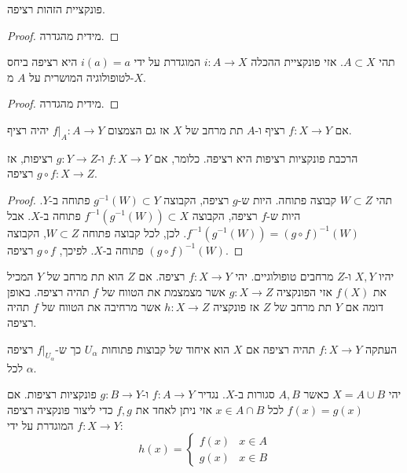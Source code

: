 \documentclass{tstextbook}
\begin{document}
\begin{proposition}
פונקציית הזהות רציפה.

\end{proposition}
\begin{proof}
מידית מהגדרה.

\end{proof}
\begin{proposition}
תהי \(A \subset X\). אזי פונקציית ההכלה \(i: A \to X\) המוגדרת על ידי \(i(a) = a\) היא רציפה ביחס לטופולוגיה המושרית על \(A\) מ-\(X\).

\end{proposition}
\begin{proof}
מידית מהגדרה.

\end{proof}
\begin{proposition}
אם \(f:X\to Y\) רציף ו-\(A\) תת מרחב של \(X\) אז גם הצמצום \(f|_{A}:A\to Y\) יהיה רציף.

\end{proposition}
\begin{proposition}
הרכבת פונקציות רציפות היא רציפה. כלומר, אם \(f: X \to Y\) ו-\(g: Y \to Z\) רציפות, אז \(g \circ f: X \to Z\) רציפה.

\end{proposition}
\begin{proof}
תהי \(W \subset Z\) קבוצה פתוחה. היות ש-\(g\) רציפה, הקבוצה \(g^{-1}(W) \subset Y\) פתוחה ב-\(Y\). היות ש-\(f\) רציפה, הקבוצה \(f^{-1}(g^{-1}(W)) \subset X\) פתוחה ב-\(X\). אבל \(f^{-1}(g^{-1}(W)) = (g \circ f)^{-1}(W)\). לכן, לכל קבוצה פתוחה \(W \subset Z\), הקבוצה \((g \circ f)^{-1}(W)\) פתוחה ב-\(X\). לפיכך, \(g \circ f\) רציפה.

\end{proof}
\begin{proposition}
יהיו \(X,Y\) ו-\(Z\) מרחבים טופולוגיים. יהי \(f:X\to Y\) רציפה. אם \(Z\) הוא תת מרחב של \(Y\) המכיל את \(f(X)\) אזי הפונקציה \(g:X\to Z\) אשר מצמצמת את הטווח של \(f\) תהיה רציפה. באופן דומה אם \(Y\) תת מרחב של \(Z\) אז פונקציה \(h:X\to Z\) אשר מרחיבה את הטווח של \(f\) תהיה רציפה.

\end{proposition}
\begin{proposition}
העתקה \(f:X\to Y\) תהיה רציפה אם \(X\) הוא איחוד של קבוצות פתוחות \(U_{\alpha}\) כך ש-\(f|_{U_{\alpha}}\) רציפה לכל \(\alpha\).

\end{proposition}
\begin{proposition}
יהי \(X=A\cup B\) כאשר \(A,B\) סגורות ב-\(X\). נגדיר \(f:A\to Y\) ו-\(g:B\to Y\) פונקציות רציפות. אם \(f(x)=g(x)\) לכל \(x \in A \cap B\) אזי ניתן לאחד את \(f,g\) כדי ליצור פונקציה רציפה \(f:X\to Y\) המוגדרת על ידי:
$$h(x)=\begin{cases}f(x) & x \in A \\g(x) & x \in B
\end{cases}$$

\end{proposition}
\end{document}
